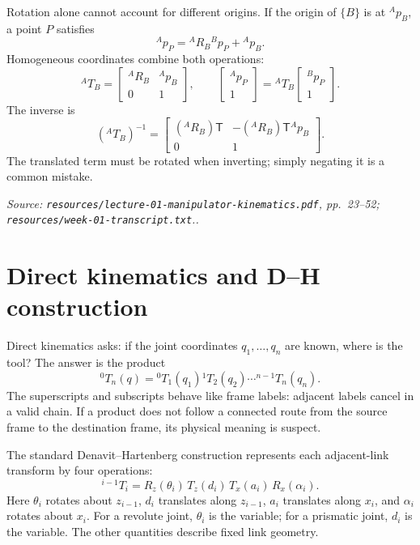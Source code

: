 \documentclass[11pt,a4paper]{article}
\renewcommand{\texttt}[1]{\nolinkurl{#1}}
\newcommand{\trans}{\mathsf{T}}
\newcommand{\source}[1]{\par\smallskip\noindent\textit{Source: #1.}\par\smallskip}
\begin{document}
Rotation alone cannot account for different origins. If the origin of $\{B\}$ is at ${}^{A}\!p_B$, a point $P$ satisfies
\[
 {}^{A}\!p_P={}^A\!R_B{}^B\!p_P+{}^A\!p_B.
\]
Homogeneous coordinates combine both operations:
\[
 {}^A\!T_B=\begin{bmatrix}{}^A\!R_B&{}^A\!p_B\\0&1\end{bmatrix},\qquad
 \begin{bmatrix}{}^A\!p_P\\1\end{bmatrix}={}^A\!T_B\begin{bmatrix}{}^B\!p_P\\1\end{bmatrix}.
\]
The inverse is
\[
 ({}^A\!T_B)^{-1}=\begin{bmatrix}({}^A\!R_B)\trans&-({}^A\!R_B)\trans{}^A\!p_B\\0&1\end{bmatrix}.
\]
The translated term must be rotated when inverting; simply negating it is a common mistake.
\source{\texttt{resources/lecture-01-manipulator-kinematics.pdf}, pp.~23--52; \texttt{resources/week-01-transcript.txt}.}

\section{\enspace Direct kinematics and D--H construction}
Direct kinematics asks: if the joint coordinates $q_1,\ldots,q_n$ are known, where is the tool? The answer is the product
\[
 {}^0T_n(q)={}^0T_1(q_1){}^1T_2(q_2)\cdots{}^{n-1}T_n(q_n).
\]
The superscripts and subscripts behave like frame labels: adjacent labels cancel in a valid chain. If a product does not follow a connected route from the source frame to the destination frame, its physical meaning is suspect.

The standard Denavit--Hartenberg construction represents each adjacent-link transform by four operations:
\[
 {}^{i-1}T_i=R_z(\theta_i)\,T_z(d_i)\,T_x(a_i)\,R_x(\alpha_i).
\]
Here $\theta_i$ rotates about $z_{i-1}$, $d_i$ translates along $z_{i-1}$, $a_i$ translates along $x_i$, and $\alpha_i$ rotates about $x_i$. For a revolute joint, $\theta_i$ is the variable; for a prismatic joint, $d_i$ is the variable. The other quantities describe fixed link geometry.
\end{document}
